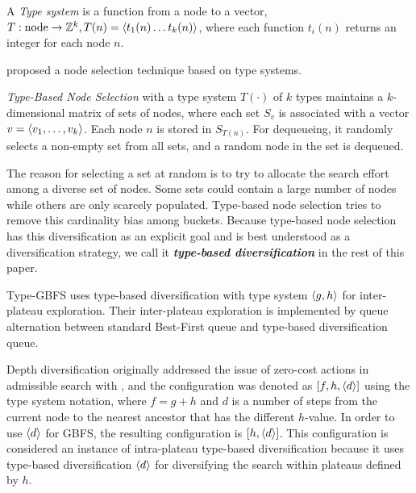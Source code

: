 \begin{defi} 
A \emph{Type system} \cite{lelis2013stratified} is a 
function from a node to a vector,
$T: \text{node} \rightarrow \mathbb{Z}^k, T(n)={\left<t_1(n) \ldots t_k(n)\right>} $, where each function $t_i(n)$ returns an integer for each node $n$.
\end{defi}


\citeauthor{xie14type} proposed a node selection technique based on type systems.

\begin{defi}
 \emph{Type-Based Node Selection} \cite{xie14type}
with a type system $T(\cdot)$ of $k$ types maintains a $k$-dimensional matrix of sets of nodes,
 where each set $S_v$ is associated with a vector $v={\left<v_1,\ldots,v_k\right>}$.
 Each node $n$ is stored in $S_{T(n)}$.
 For dequeueing, it randomly selects a non-empty set from all sets,
 and a random node in the set is dequeued.
\end{defi}

The reason for selecting a set at random is to try to allocate the search effort among a diverse set of nodes.
Some sets could contain a large number of nodes while others are only scarcely populated.
Type-based node selection tries to remove this cardinality bias among buckets.
Because type-based node selection  has this diversification as an explicit goal and is best understood as a diversification strategy, we call it \textbf{\emph{type-based diversification}} in the rest of this paper.

Type-GBFS \cite{xie14type} uses type-based diversification with type system ${\left<g,h\right>}$ for inter-plateau
exploration. Their inter-plateau exploration is implemented by queue alternation \cite{RogerH10} between
standard Best-First queue and type-based diversification queue.

Depth diversification \cite{Asai2016} originally addressed the issue of zero-cost actions in admissible search with \astar,
and the configuration was denoted as $[f,h,{\left<d\right>}]$ using the type system notation, where $f=g+h$ and $d$ is a number of steps from the current node to the nearest ancestor that has the different $h$-value.
In order to use ${\left<d\right>}$ for GBFS, the resulting configuration is $[h,{\left<d\right>}]$.
This configuration is considered an instance of intra-plateau type-based diversification because
it uses type-based diversification ${\left<d\right>}$ for diversifying the search within plateaus defined by $h$.

